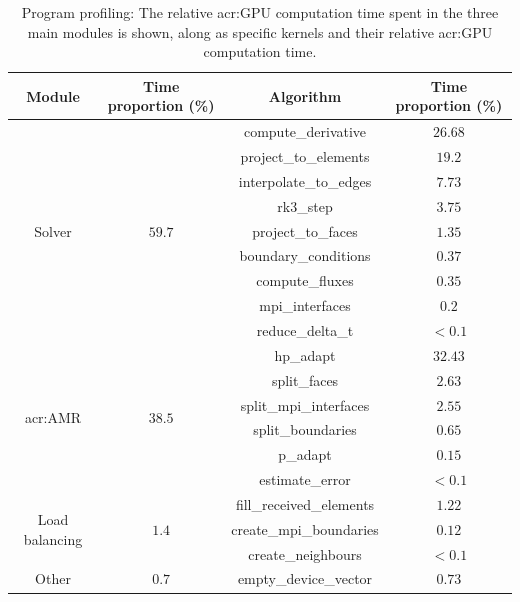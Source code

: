 \begin{table}[H]
	\centering
	\begin{tabular}{ c c c c }
		Module & Time proportion (\%) & Algorithm & Time proportion (\%) \\
		\toprule
		\multirow{9}{*}{Solver} & \multirow{9}{*}{\(59.7\)} & compute\_derivative & \(26.68\) \\
		                                                  & & project\_to\_elements & \(19.2\) \\
		                                                  & & interpolate\_to\_edges & \(7.73\) \\
		                                                  & & rk3\_step & \(3.75\) \\
		                                                  & & project\_to\_faces & \(1.35\) \\
		                                                  & & boundary\_conditions & \(0.37\) \\
		                                                  & & compute\_fluxes & \(0.35\) \\
		                                                  & & mpi\_interfaces & \(0.2\) \\
		                                                  & & reduce\_delta\_t & \(<0.1\) \\
        \midrule
        \multirow{6}{*}{\Acrshort{acr:AMR}} & \multirow{6}{*}{\(38.5\)} & hp\_adapt & \(32.43\) \\
                                                                      & & split\_faces & \(2.63\) \\
                                                                      & & split\_mpi\_interfaces & \(2.55\) \\
                                                                      & & split\_boundaries & \(0.65\) \\
                                                                      & & p\_adapt & \(0.15\) \\
                                                                      & & estimate\_error & \(<0.1\) \\
        \midrule
        \multirow{3}{*}{Load balancing} & \multirow{3}{*}{\(1.4\)} & fill\_received\_elements & \(1.22\) \\
                                                                 & & create\_mpi\_boundaries & \(0.12\) \\
                                                                 & & create\_neighbours & \(<0.1\) \\
        \midrule
        \multirow{1}{*}{Other} & \multirow{1}{*}{\(0.7\)} & empty\_device\_vector & \(0.73\) \\
	\end{tabular}
	\caption{Program profiling: The relative \acrshort{acr:GPU} computation time spent in the three main modules is shown, along as specific kernels and their relative \acrshort{acr:GPU} computation time.}\label{table:profiling}
\end{table}

